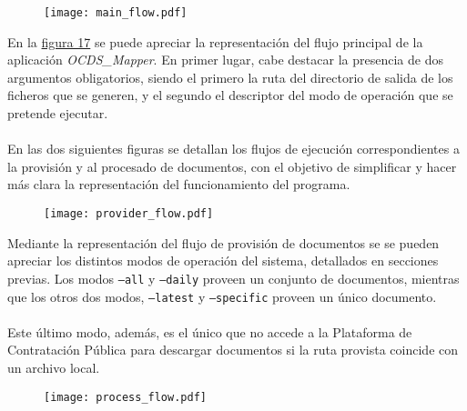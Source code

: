         \begin{figure}[!htb]
            \centering
            \texttt{[image: main\_flow.pdf]}
            \label{fig:mainflow}
        \end{figure}
        
        \noindent En la \hyperref[fig:mainflow]{figura 17} se puede apreciar la representación del flujo principal de la aplicación \textit{OCDS\_Mapper}. En primer lugar, cabe destacar la presencia de dos argumentos obligatorios, siendo el primero la ruta del directorio de salida de los ficheros que se generen, y el segundo el descriptor del modo de operación que se pretende ejecutar.
        \\ \\
        En las dos siguientes figuras se detallan los flujos de ejecución correspondientes a la provisión y al procesado de documentos, con el objetivo de simplificar y hacer más clara la representación del funcionamiento del programa.
        
        \begin{figure}[!htb]
            \centering
            \texttt{[image: provider\_flow.pdf]}
            \label{fig:providerflow}
        \end{figure}
        
        \noindent Mediante la representación del flujo de provisión de documentos se se pueden apreciar los distintos modos de operación del sistema, detallados en secciones previas. Los modos \texttt{--all} y \texttt{--daily} proveen un conjunto de documentos, mientras que los otros dos modos, \texttt{--latest} y \texttt{--specific} proveen un único documento.
        \\ \\
        Este último modo, además, es el único que no accede a la Plataforma de Contratación Pública para descargar documentos si la ruta provista coincide con un archivo local.
        
    \vspace{3cm}
        
        \begin{figure}[!htb]
            \centering
            \texttt{[image: process\_flow.pdf]}
            \label{fig:processflow}
        \end{figure}
        
